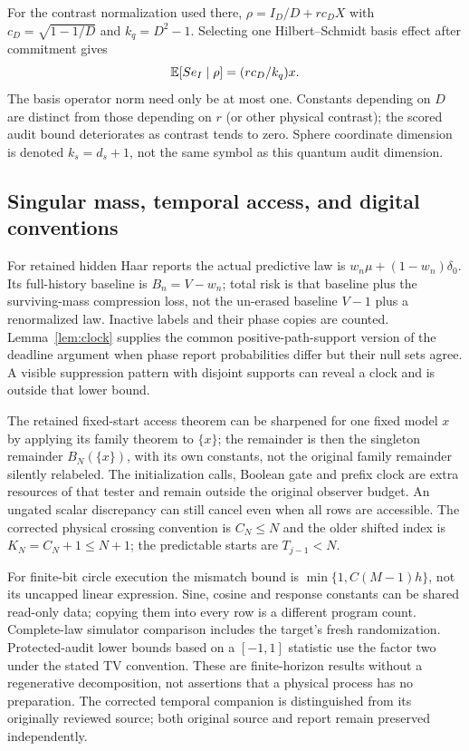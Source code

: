 For the contrast normalization used there, $\rho=I_D/D+r c_D X$ with $c_D=\sqrt{1-1/D}$ and $k_q=D^2-1$. Selecting one Hilbert--Schmidt basis effect after commitment gives
\[
 \mathbb E[S e_I\mid\rho]=(r c_D/k_q)x.
\]
The basis operator norm need only be at most one. Constants depending on $D$ are distinct from those depending on $r$ (or other physical contrast); the scored audit bound deteriorates as contrast tends to zero. Sphere coordinate dimension is denoted $k_s=d_s+1$, not the same symbol as this quantum audit dimension.

\subsection{Singular mass, temporal access, and digital conventions}
For retained hidden Haar reports the actual predictive law is $w_n\mu+(1-w_n)\delta_0$. Its full-history baseline is $B_n=V-w_n$; total risk is that baseline plus the surviving-mass compression loss, not the un-erased baseline $V-1$ plus a renormalized law. Inactive labels and their phase copies are counted. Lemma~\ref{lem:clock} supplies the common positive-path-support version of the deadline argument when phase report probabilities differ but their null sets agree. A visible suppression pattern with disjoint supports can reveal a clock and is outside that lower bound.

The retained fixed-start access theorem can be sharpened for one fixed model $x$ by applying its family theorem to $\{x\}$; the remainder is then the singleton remainder $B_N(\{x\})$, with its own constants, not the original family remainder silently relabeled. The initialization calls, Boolean gate and prefix clock are extra resources of that tester and remain outside the original observer budget. An ungated scalar discrepancy can still cancel even when all rows are accessible. The corrected physical crossing convention is $C_N\le N$ and the older shifted index is $K_N=C_N+1\le N+1$; the predictable starts are $T_{j-1}<N$.

For finite-bit circle execution the mismatch bound is $\min\{1,C(M-1)h\}$, not its uncapped linear expression. Sine, cosine and response constants can be shared read-only data; copying them into every row is a different program count. Complete-law simulator comparison includes the target's fresh randomization. Protected-audit lower bounds based on a $[-1,1]$ statistic use the factor two under the stated TV convention. These are finite-horizon results without a regenerative decomposition, not assertions that a physical process has no preparation. The corrected temporal companion is distinguished from its originally reviewed source; both original source and report remain preserved independently.
